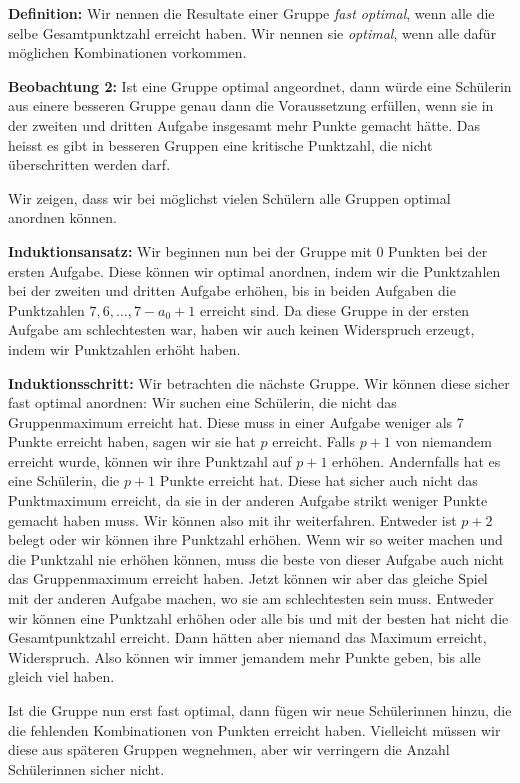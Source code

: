 \documentclass[language=german,style=solution]{smo}
\begin{document}
\begin{enumerate}
\textbf{Definition:} Wir nennen die Resultate einer Gruppe \emph{fast optimal}, wenn alle die selbe Gesamtpunktzahl erreicht haben. Wir nennen sie \emph{optimal}, wenn alle dafür möglichen Kombinationen vorkommen.

\textbf{Beobachtung 2:} Ist eine Gruppe optimal angeordnet, dann würde eine Schülerin aus einere besseren Gruppe genau dann die Voraussetzung erfüllen, wenn sie in der zweiten und dritten Aufgabe insgesamt mehr Punkte gemacht hätte. Das heisst es gibt in besseren Gruppen eine kritische Punktzahl, die nicht überschritten werden darf.

Wir zeigen, dass wir bei möglichst vielen Schülern alle Gruppen optimal anordnen können.

\textbf{Induktionsansatz:} Wir beginnen nun bei der Gruppe mit 0 Punkten bei der ersten Aufgabe. Diese können wir optimal anordnen, indem wir die Punktzahlen bei der zweiten und dritten Aufgabe erhöhen, bis in beiden Aufgaben die Punktzahlen $7,6, \ldots, 7-a_0+1$ erreicht sind. Da diese Gruppe in der ersten Aufgabe am schlechtesten war, haben wir auch keinen Widerspruch erzeugt, indem wir Punktzahlen erhöht haben.

\textbf{Induktionsschritt:} Wir betrachten die nächste Gruppe. Wir können diese sicher fast optimal anordnen: Wir suchen eine Schülerin, die nicht das Gruppenmaximum erreicht hat. Diese muss in einer Aufgabe weniger als 7 Punkte erreicht haben, sagen wir sie hat $p$ erreicht. Falls $p+1$ von niemandem erreicht wurde, können wir ihre Punktzahl auf $p+1$ erhöhen. Andernfalls hat es eine Schülerin, die $p+1$ Punkte erreicht hat. Diese hat sicher auch nicht das Punktmaximum erreicht, da sie in der anderen Aufgabe strikt weniger Punkte gemacht haben muss. Wir können also mit ihr weiterfahren. Entweder ist $p+2$ belegt oder wir können ihre Punktzahl erhöhen. Wenn wir so weiter machen und die Punktzahl nie erhöhen können, muss die beste von dieser Aufgabe auch nicht das Gruppenmaximum erreicht haben. Jetzt können wir aber das gleiche Spiel mit der anderen Aufgabe machen, wo sie am schlechtesten sein muss. Entweder wir können eine Punktzahl erhöhen oder alle bis und mit der besten hat nicht die Gesamtpunktzahl erreicht. Dann hätten aber niemand das Maximum erreicht, Widerspruch. Also können wir immer jemandem mehr Punkte geben, bis alle gleich viel haben.

Ist die Gruppe nun erst fast optimal, dann fügen wir neue Schülerinnen hinzu, die die fehlenden Kombinationen von Punkten erreicht haben. Vielleicht müssen wir diese aus späteren Gruppen wegnehmen, aber wir verringern die Anzahl Schülerinnen sicher nicht.


\end{enumerate}
\end{document}

